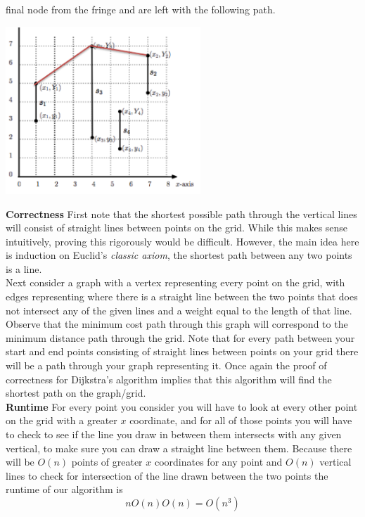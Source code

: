 \documentclass[11pt]{article}
\begin{document}
\begin{enumerate}
		final node from the fringe and are left with the following path.\\
		\begin{center}
		\includegraphics[width=0.55\textwidth]{images/fig4}
		\end{center}
		\textbf{Correctness}
				First note that the shortest possible path
				through the vertical lines will consist of
				straight lines between points on the grid. While
				this makes sense intuitively, 
				proving this rigorously would be difficult. However, the
				main idea here is induction on 
				Euclid's \textit{classic axiom}, the
				shortest path between any two points is a
				line. \\
				Next
				consider a graph with a vertex representing
				every point on the grid, with
				edges representing where there is a straight line between
				the two points that does not intersect any of
				the given lines and a weight equal to the
				length of that line. Observe that the
				minimum cost path through this graph will
				correspond to the minimum distance path through
				the grid. Note that for every path
				between your start and end points consisting of
				straight 
				lines between points on your grid there will be a
				path through your graph representing it. Once
				again the proof of correctness for Dijkstra's
				algorithm implies that this algorithm will find
				the shortest path on the graph/grid.\\
		\textbf{Runtime}
			For every point you consider you will have to look at
			every other point on the grid with a greater $x$
			coordinate, and for all of those points you will have to
			check to see if the line you draw in between them
			intersects with any given vertical, to
			make sure you can draw a straight line between them.
			Because there will be $O(n)$ points of greater $x$
			coordinates for
			any point and $O(n)$ vertical lines to check for
			intersection of the line drawn between the two points
			  the runtime of our algorithm is
			$$nO(n)O(n) = O(n^3)$$
\end{enumerate}
\end{document}
